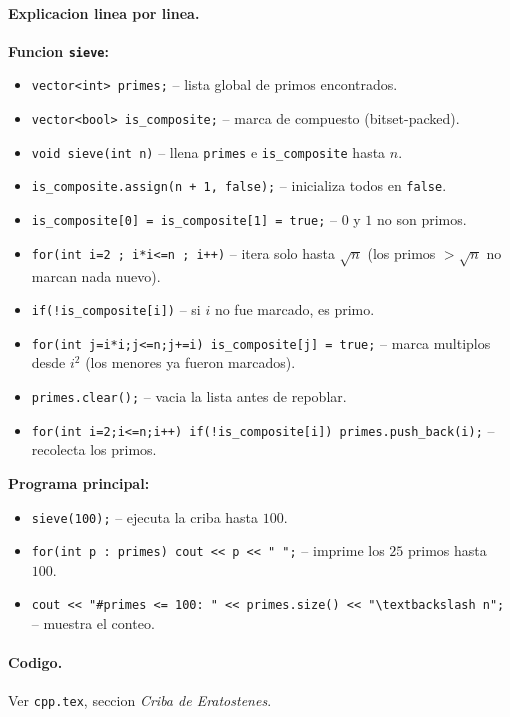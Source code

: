\paragraph{Explicacion linea por linea.}
\textbf{Funcion \texttt{sieve}:}
\begin{itemize}\setlength\itemsep{0pt}
	\item \verb|vector<int> primes;| -- lista global de primos encontrados.
	\item \verb|vector<bool> is_composite;| -- marca de compuesto (bitset-packed).
	\item \verb|void sieve(int n)| -- llena \texttt{primes} e \texttt{is\_composite} hasta $n$.
	\item \verb|is_composite.assign(n + 1, false);| -- inicializa todos en \texttt{false}.
	\item \verb|is_composite[0] = is_composite[1] = true;| -- $0$ y $1$ no son primos.
	\item \verb|for(int i=2 ; i*i<=n ; i++)| -- itera solo hasta $\sqrt{n}$ (los primos $> \sqrt{n}$ no marcan nada nuevo).
	\item \verb|if(!is_composite[i])| -- si $i$ no fue marcado, es primo.
	\item \verb|for(int j=i*i;j<=n;j+=i) is_composite[j] = true;| -- marca multiplos desde $i^2$ (los menores ya fueron marcados).
	\item \verb|primes.clear();| -- vacia la lista antes de repoblar.
	\item \verb|for(int i=2;i<=n;i++) if(!is_composite[i]) primes.push_back(i);| -- recolecta los primos.
\end{itemize}
\textbf{Programa principal:}
\begin{itemize}\setlength\itemsep{0pt}
	\item \verb|sieve(100);| -- ejecuta la criba hasta $100$.
	\item \verb|for(int p : primes) cout << p << " ";| -- imprime los $25$ primos hasta $100$.
	\item \verb|cout << "#primes <= 100: " << primes.size() << "\textbackslash n";| -- muestra el conteo.
\end{itemize}

\paragraph{Codigo.}
Ver \texttt{cpp.tex}, seccion \textit{Criba de Eratostenes}.

\vspace{0.5em|||}
